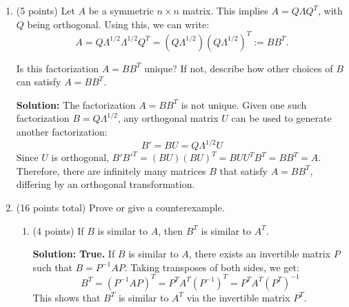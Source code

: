\documentclass[12pt]{article}
\newcommand{\qspace}{\vspace{1em}} %
\newenvironment{solution}{\noindent\textbf{Solution:} }{\qspace}
\begin{document}
\begin{enumerate}
\begin{enumerate}
        \begin{solution}
        The determinant of an orthogonal matrix is either \( +1 \) or \( -1 \).

        Geometrically, this makes sense because orthogonal matrices represent rotations and reflections, which preserve volume and orientation (up to a sign). A determinant of \( +1 \) corresponds to a rotation (preserving orientation), while a determinant of \( -1 \) corresponds to a reflection (reversing orientation). Both operations preserve the magnitude of volume in the space.
        \end{solution}
    \end{enumerate}
    
    \item (5 points) Let \( A \) be a symmetric \( n \times n \) matrix. This implies \( A = Q \Lambda Q^T \), with \( Q \) being orthogonal. Using this, we can write:
\[
A = Q \Lambda^{1/2} \Lambda^{1/2} Q^T = (Q \Lambda^{1/2})(Q \Lambda^{1/2})^T := BB^T.
\]

Is this factorization \( A = BB^T \) unique? If not, describe how other choices of \( B \) can satisfy \( A = BB^T \).

\begin{solution}
The factorization \( A = BB^T \) is not unique. Given one such factorization \( B = Q \Lambda^{1/2} \), any orthogonal matrix \( U \) can be used to generate another factorization:
\[
B' = BU = Q \Lambda^{1/2} U
\]
Since \( U \) is orthogonal, \( B'B'^T = (BU)(BU)^T = BUU^T B^T = B B^T = A \). Therefore, there are infinitely many matrices \( B \) that satisfy \( A = BB^T \), differing by an orthogonal transformation.
\end{solution}
    
    \item (16 points total) Prove or give a counterexample.
    \begin{enumerate}
        \item (4 points) If \( B \) is similar to \( A \), then \( B^T \) is similar to \( A^T \).

        \begin{solution}
        \textbf{True.} If \( B \) is similar to \( A \), there exists an invertible matrix \( P \) such that \( B = P^{-1}AP \). Taking transposes of both sides, we get:
        \[
        B^T = (P^{-1}AP)^T = P^T A^T (P^{-1})^T = P^T A^T (P^T)^{-1}
        \]
        This shows that \( B^T \) is similar to \( A^T \) via the invertible matrix \( P^T \).
        \end{solution}
        

\end{enumerate}
\end{enumerate}
\end{document}
